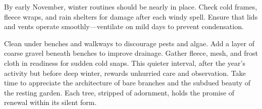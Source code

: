 \medskip
{}
\noindent
By early November, winter routines should be nearly in place.
Check cold frames, fleece wraps, and rain shelters for damage after each windy spell.
Ensure that lids and vents operate smoothly---ventilate on mild days to prevent condensation.

Clean under benches and walkways to discourage pests and algae.
Add a layer of coarse gravel beneath benches to improve drainage.
Gather fleece, mesh, and frost cloth in readiness for sudden cold snaps.
This quieter interval, after the year's activity but before deep winter, rewards unhurried care and observation.
Take time to appreciate the architecture of bare branches and the subdued beauty of the resting garden.
Each tree, stripped of adornment, holds the promise of renewal within its silent form.
\closearticle
